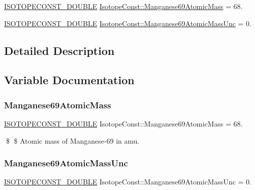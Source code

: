 \begin{DoxyCompactItemize}
\item 
\mbox{\hyperlink{group___isotope_const-_macros_ga8f45a7272ce02c0b4c65c44636ed719a}{I\+S\+O\+T\+O\+P\+E\+C\+O\+N\+S\+T\+\_\+\+D\+O\+U\+B\+LE}} \mbox{\hyperlink{group___isotope_const-_manganese-_mn69_ga915bdb8422f2634c897a9bd0f0d2e88c}{Isotope\+Const\+::\+Manganese69\+Atomic\+Mass}} = 68.
\item 
\mbox{\hyperlink{group___isotope_const-_macros_ga8f45a7272ce02c0b4c65c44636ed719a}{I\+S\+O\+T\+O\+P\+E\+C\+O\+N\+S\+T\+\_\+\+D\+O\+U\+B\+LE}} \mbox{\hyperlink{group___isotope_const-_manganese-_mn69_ga7068508c00c25be8a62d55edbb963236}{Isotope\+Const\+::\+Manganese69\+Atomic\+Mass\+Unc}} = 0.
\end{DoxyCompactItemize}


\subsection{Detailed Description}


\subsection{Variable Documentation}
\mbox{\label{group___isotope_const-_manganese-_mn69_ga915bdb8422f2634c897a9bd0f0d2e88c}} 
\subsubsection{\texorpdfstring{Manganese69\+Atomic\+Mass}{Manganese69AtomicMass}}
{\footnotesize\ttfamily \mbox{\hyperlink{group___isotope_const-_macros_ga8f45a7272ce02c0b4c65c44636ed719a}{I\+S\+O\+T\+O\+P\+E\+C\+O\+N\+S\+T\+\_\+\+D\+O\+U\+B\+LE}} Isotope\+Const\+::\+Manganese69\+Atomic\+Mass = 68.}

\$ \$ Atomic mass of Manganese-\/69 in amu. \mbox{\label{group___isotope_const-_manganese-_mn69_ga7068508c00c25be8a62d55edbb963236}} 
\subsubsection{\texorpdfstring{Manganese69\+Atomic\+Mass\+Unc}{Manganese69AtomicMassUnc}}
{\footnotesize\ttfamily \mbox{\hyperlink{group___isotope_const-_macros_ga8f45a7272ce02c0b4c65c44636ed719a}{I\+S\+O\+T\+O\+P\+E\+C\+O\+N\+S\+T\+\_\+\+D\+O\+U\+B\+LE}} Isotope\+Const\+::\+Manganese69\+Atomic\+Mass\+Unc = 0.}


